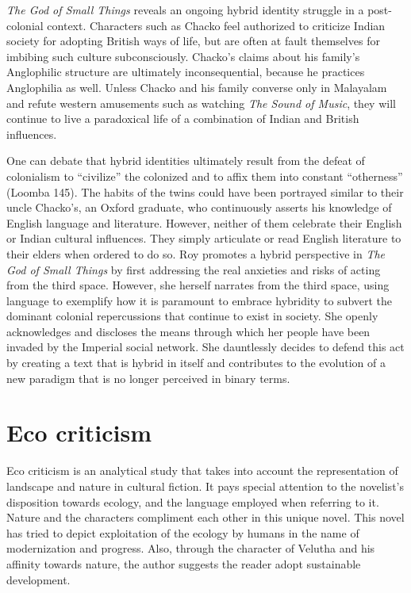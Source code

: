 \emph{The God of Small Things }reveals an ongoing hybrid identity struggle in a post-colonial context. Characters such as Chacko feel authorized to criticize Indian society for adopting British ways of life, but are often at fault themselves for imbibing such culture subconsciously. Chacko’s claims about his family’s Anglophilic structure are ultimately inconsequential, because he practices Anglophilia as well. Unless Chacko and his family converse only in Malayalam and refute western amusements such as watching \emph{The Sound of Music}, they will continue to live a paradoxical life of a combination of Indian and British influences. 

One can debate that hybrid identities ultimately result from the defeat of colonialism to “civilize” the colonized and to affix them into constant “otherness” (Loomba 145). The habits of the twins could have been portrayed similar to their uncle Chacko’s, an Oxford graduate, who continuously asserts his knowledge of English language and literature. However, neither of them celebrate their English or Indian cultural influences. They simply articulate or read English literature to their elders when ordered to do so. Roy promotes a hybrid perspective in \emph{The God of Small Things} by first addressing the real anxieties and risks of acting from the third space. However, she herself narrates from the third space, using language to exemplify how it is paramount to embrace hybridity to subvert the dominant colonial repercussions that continue to exist in society. She openly acknowledges and discloses the means through which her people have been invaded by the Imperial social network. She dauntlessly decides to defend this act by creating a text that is hybrid in itself and contributes to the evolution of a new paradigm that is no longer perceived in binary terms. 

\section{Eco criticism}

Eco criticism is an analytical study that takes into account the representation of landscape and nature in cultural fiction. It pays special attention to the novelist’s disposition towards ecology, and the language employed when referring to it. Nature and the characters compliment each other in this unique novel. This novel has tried to depict exploitation of the ecology by humans in the name of modernization and progress. Also, through the character of Velutha and his affinity towards nature, the author suggests the reader adopt sustainable development.

